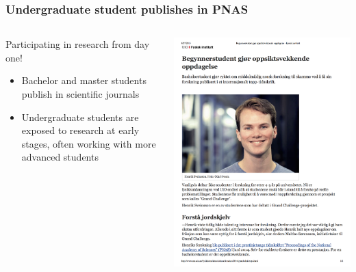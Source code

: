 \documentclass{beamer}
\begin{document}
\begin{frame}
\frametitle{Undergraduate student publishes in PNAS}

\begin{columns}
\begin{block}{Participating in research from day one! }
\begin{itemize}
\item Bachelor and master students publish in scientific journals 

\item Undergraduate students are exposed to research at early stages, often working with more advanced students
\end{itemize}

\noindent
\end{block}

\centerline{\includegraphics[width=1.0\linewidth]{fig-future/pnas.png}}



\end{columns}
\end{frame}
\end{document}
